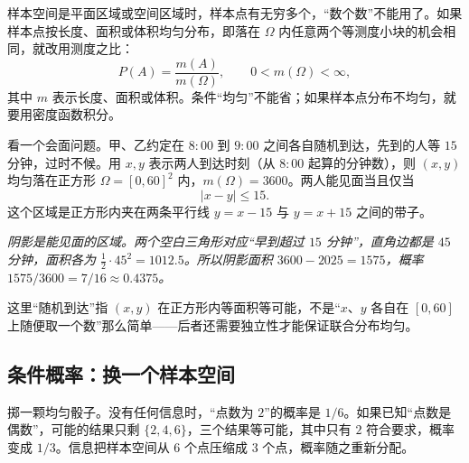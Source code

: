 样本空间是平面区域或空间区域时，样本点有无穷多个，“数个数”不能用了。如果样本点按长度、面积或体积均匀分布，即落在 $\Omega$ 内任意两个等测度小块的机会相同，就改用测度之比：
\[
P(A)=\frac{m(A)}{m(\Omega)},\qquad 0<m(\Omega)<\infty,
\]
其中 $m$ 表示长度、面积或体积。条件“均匀”不能省；如果样本点分布不均匀，就要用密度函数积分。

看一个会面问题。甲、乙约定在 $8{:}00$ 到 $9{:}00$ 之间各自随机到达，先到的人等 $15$ 分钟，过时不候。用 $x,y$ 表示两人到达时刻（从 $8{:}00$ 起算的分钟数），则 $(x,y)$ 均匀落在正方形 $\Omega=[0,60]^2$ 内，$m(\Omega)=3600$。两人能见面当且仅当
\[
|x-y|\le 15 .
\]
这个区域是正方形内夹在两条平行线 $y=x-15$ 与 $y=x+15$ 之间的带子。

\begin{center}
\par\vspace{2pt}
{\footnotesize\itshape 阴影是能见面的区域。两个空白三角形对应“早到超过 $15$ 分钟”，直角边都是 $45$ 分钟，面积各为 $\frac12\cdot45^2=1012.5$。所以阴影面积 $3600-2025=1575$，概率 $1575/3600=7/16\approx0.4375$。}
\end{center}

这里“随机到达”指 $(x,y)$ 在正方形内等面积等可能，不是“$x$、$y$ 各自在 $[0,60]$ 上随便取一个数”那么简单——后者还需要独立性才能保证联合分布均匀。

\subsection{条件概率：换一个样本空间}

掷一颗均匀骰子。没有任何信息时，“点数为 $2$”的概率是 $1/6$。如果已知“点数是偶数”，可能的结果只剩 $\{2,4,6\}$，三个结果等可能，其中只有 $2$ 符合要求，概率变成 $1/3$。信息把样本空间从 $6$ 个点压缩成 $3$ 个点，概率随之重新分配。

